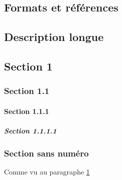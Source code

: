 \documentclass{article}
\begin{document}
\begin{multicols*}{3}
\begin{latexcode}
\end{latexcode}

\section*{Formats et références}
\begin{latexcode}
\tableofcontents   %
\listoffigures     %
\listoftables      %
\listoflistings    %
\index             %
\printindex        %
\printglossary     %
\printbibliography %

\chapter[Description courte]{Description longue}
\label{subsec:foobar}
\section{Section 1}
  \subsection{Section 1.1}
    \subsubsection{Section 1.1.1}
      \paragraph{Section 1.1.1.1}
  \subsection*{Section sans numéro}
Comme vu au paragraphe \ref{subsec:foobar}
\end{latexcode}


\end{multicols*}
\end{document}
